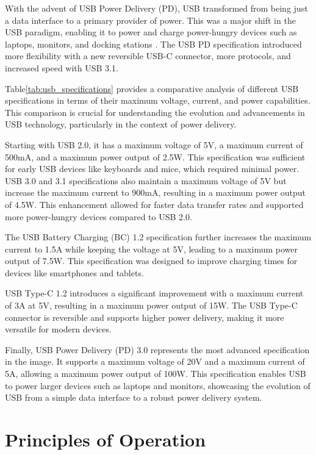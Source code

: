 With the advent of USB Power Delivery (PD), USB transformed from being just a data interface to a primary provider of power. This was a major shift in the USB paradigm, enabling it to power and charge power-hungry devices such as laptops, monitors, and docking stations \cite{Truechip2024}. The USB PD specification introduced more flexibility with a new reversible USB-C connector, more protocols, and increased speed with USB 3.1.

Table\ref{tab:usb_specifications} provides a comparative analysis of different USB specifications in terms of their maximum voltage, current, and power capabilities. This comparison is crucial for understanding the evolution and advancements in USB technology, particularly in the context of power delivery.

Starting with USB 2.0, it has a maximum voltage of 5V, a maximum current of 500mA, and a maximum power output of 2.5W. This specification was sufficient for early USB devices like keyboards and mice, which required minimal power.
USB 3.0 and 3.1 specifications also maintain a maximum voltage of 5V but increase the maximum current to 900mA, resulting in a maximum power output of 4.5W. This enhancement allowed for faster data transfer rates and supported more power-hungry devices compared to USB 2.0.

The USB Battery Charging (BC) 1.2 specification further increases the maximum current to 1.5A while keeping the voltage at 5V, leading to a maximum power output of 7.5W. This specification was designed to improve charging times for devices like smartphones and tablets.

USB Type-C 1.2 introduces a significant improvement with a maximum current of 3A at 5V, resulting in a maximum power output of 15W. The USB Type-C connector is reversible and supports higher power delivery, making it more versatile for modern devices.

Finally, USB Power Delivery (PD) 3.0 represents the most advanced specification in the image. It supports a maximum voltage of 20V and a maximum current of 5A, allowing a maximum power output of 100W. This specification enables USB to power larger devices such as laptops and monitors, showcasing the evolution of USB from a simple data interface to a robust power delivery system.

\section{Principles of Operation}
